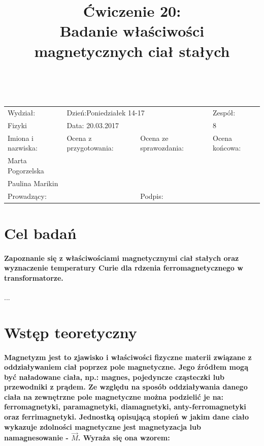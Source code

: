\documentclass[a4paper,10pt]{article}
\def\arraystretch{1.2}
\begin{document}
\begin{table}
  \centering
  \def\arraystretch{1.5}
    \begin{tabular}{|l|l|l|l|} \hline
    Wydział:           & \multicolumn{2}{l|}{Dzień:Poniedziałek 14-17}    &Zespół:  \\
    Fizyki             &    \multicolumn{2}{l|}{Data: 20.03.2017}         &8             \\\hline
    Imiona i nazwiska: &Ocena z przygotowania:  &Ocena ze sprawozdania:   &Ocena końcowa: \\
    Marta Pogorzelska  &                        &                         &                \\
    Paulina Marikin    &                        &                         &\\\hline
    \multicolumn{2}{|l|}{Prowadzący:                 } &\multicolumn{2}{l|}{Podpis:             }  \\\hline
  \end{tabular}
\end{table}

\title{Ćwiczenie 20:\\Badanie właściwości magnetycznych ciał stałych}
\date{}
\maketitle{}

\section{Cel badań}
\paragraph{Zapoznanie się z właściwościami magnetycznymi ciał stałych oraz wyznaczenie temperatury Curie dla rdzenia ferromagnetycznego w transformatorze.}...

\section{Wstęp teoretyczny}
\paragraph{Magnetyzm jest to zjawisko i właściwości fizyczne materii związane z oddziaływaniem ciał poprzez pole magnetyczne. Jego źródłem mogą być naładowane ciała, np.: magnes, pojedyncze cząsteczki lub przewodniki z prądem. Ze względu na sposób oddziaływania danego ciała na zewnętrzne pole magnetyczne można podzielić je na: ferromagnetyki, paramagnetyki, diamagnetyki, anty-ferromagnetyki oraz ferrimagnetyki. Jednostką opisującą stopień w jakim dane ciało wykazuje zdolności magnetyczne jest magnetyzacja lub namagnesowanie - $\vec{M}$. Wyraża się ona wzorem:}
\end{document}
